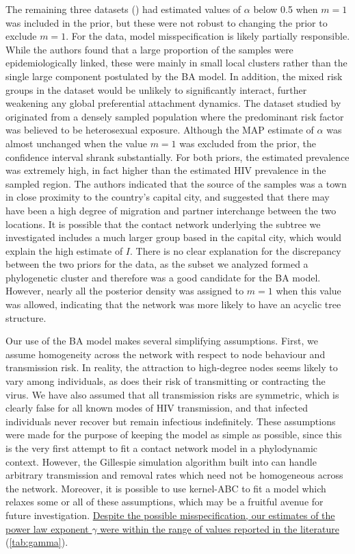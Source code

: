 The remaining three datasets (\textcite{cuevas2009hiv, novitsky2014impact,
li2015hiv}) had estimated values of $\alpha$ below 0.5 when $m = 1$ was
included in the prior, but these were not robust to changing the prior to
exclude $m = 1$. For the \citeauthor{cuevas2009hiv} data, model
misspecification is likely partially responsible. While the authors found that
a large proportion of the samples were epidemiologically linked, these were
mainly in small local clusters rather than the single large component
postulated by the BA model. In addition, the mixed risk groups in the dataset
would be unlikely to significantly interact, further weakening any global
preferential attachment dynamics. The dataset studied by
\textcite{novitsky2014impact} originated from a densely sampled population
where the predominant risk factor was believed to be heterosexual exposure.
Although the MAP estimate of $\alpha$ was almost unchanged when the value $m =
1$ was excluded from the prior, the confidence interval shrank substantially.
For both priors, the estimated prevalence was extremely high, in fact higher
than the estimated HIV prevalence in the sampled region. The authors indicated
that the source of the samples was a town in close proximity to the country's
capital city, and suggested that there may have been a high degree of migration
and partner interchange between the two locations. It is possible that the
contact network underlying the subtree we investigated includes a much larger
group based in the capital city, which would explain the high estimate of $I$.
There is no clear explanation for the discrepancy between the two priors for
the \textcite{li2015hiv} data, as the subset we analyzed formed a phylogenetic
cluster and therefore was a good candidate for the BA model. However, nearly
all the posterior density was assigned to $m = 1$ when this value was allowed,
indicating that the network was more likely to have an acyclic tree structure.

Our use of the \gls{BA} model makes several simplifying assumptions. First, we
assume homogeneity across the network with respect to node behaviour and
transmission risk. In reality, the attraction to high-degree nodes seems likely
to vary among individuals, as does their risk of transmitting or contracting
the virus. We have also assumed that all transmission risks are symmetric,
which is clearly false for all known modes of \gls{HIV} transmission, and that
infected individuals never recover but remain infectious indefinitely. These
assumptions were made for the purpose of keeping the model as simple as
possible, since this is the very first attempt to fit a contact network model
in a phylodynamic context. However, the Gillespie simulation algorithm built
into  can handle arbitrary transmission and removal rates
which need not be homogeneous across the network. Moreover, it is possible to
use kernel-\gls{ABC} to fit a model which relaxes some or all of these
assumptions, which may be a fruitful avenue for future investigation. 
\uline{Despite the possible misspecification, our estimates of the power
law exponent $\gamma$ were within the range of values reported in the
literature} (\cref{tab:gamma}).
